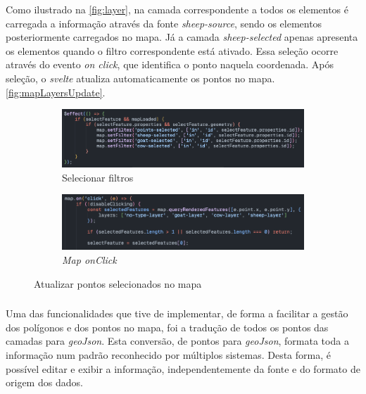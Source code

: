 Como ilustrado na \autoref{fig:layer}, na camada correspondente a todos os elementos é carregada a informação através da fonte \textit{sheep-source}, sendo os elementos posteriormente carregados no mapa. Já a camada \textit{sheep-selected} apenas apresenta os elementos quando o filtro correspondente está ativado. Essa seleção ocorre através do evento \textit{on click}, que identifica o ponto naquela coordenada. Após seleção, o \textit{svelte} atualiza automaticamente os pontos no mapa. \autoref{fig:mapLayersUpdate}.

\begin{figure}[!h]
	\centering
	\begin{subfigure}[c]{0.45\textwidth}
		\centering
		\includegraphics[width=\textwidth]{figs/setfilter.png}
		\caption{Selecionar filtros}
		\label{fig:updateMapSelected}
	\end{subfigure}
	\hfill
	\begin{subfigure}[c]{0.45\textwidth}
		\centering
		\includegraphics[width=\textwidth]{figs/mapClick.png}
		\caption{\textit{Map onClick}}
		\label{fig:mapClick}
	\end{subfigure}
	\caption{Atualizar pontos selecionados no mapa}
    \label{fig:mapLayersUpdate}
\end{figure}

\subsubsection{}\label{sec:geoJsonConverter}
Uma das funcionalidades que tive de implementar, de forma a facilitar a gestão dos polígonos e dos pontos no mapa, foi a tradução de todos os pontos das camadas para \textit{geoJson}\cite{rfc7946}. Esta conversão, de pontos para \textit{geoJson}, formata toda a informação num padrão reconhecido por múltiplos sistemas. Desta forma, é possível editar e exibir a informação, independentemente da fonte e do formato de origem dos dados.

